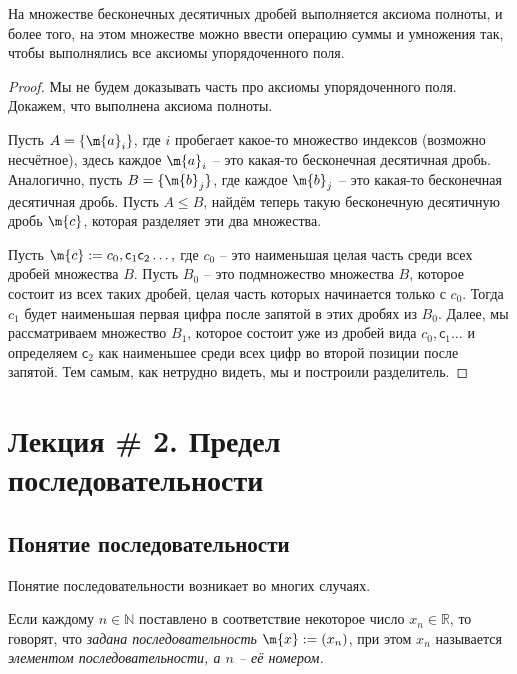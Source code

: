 \begin{theorem}
    На множестве бесконечных десятичных дробей выполняется аксиома полноты, и более того, на этом множестве можно ввести операцию суммы и умножения так, чтобы выполнялись все аксиомы упорядоченного поля.
\end{theorem}
\begin{proof}
    Мы не будем доказывать часть про аксиомы упорядоченного поля. Докажем, что выполнена аксиома полноты.

    Пусть $A = \{\m{a}_i\}$, где $i$ пробегает какое-то множество индексов (возможно несчётное), здесь каждое $\m{a}_i$ -- это какая-то бесконечная десятичная дробь. Аналогично, пусть $B = \{\m{b}_j\}$, где каждое $\m{b}_j$ -- это какая-то бесконечная десятичная дробь. Пусть $A\le B$, найдём теперь такую бесконечную десятичную дробь $\m{c}$, которая разделяет эти два множества.

    Пусть $\m{c}:= c_0,\mathsf{c}_1\mathsf{c}_2\ldots,$ где $c_0$ -- это наименьшая целая часть среди всех дробей множества $B$. Пусть $ B_0 $ -- это подмножество множества $B$, которое состоит из всех таких дробей, целая часть которых начинается только с $c_0$. Тогда $c_1$ будет наименьшая первая цифра после запятой в этих дробях из $B_0$. Далее, мы рассматриваем множество $B_1$, которое состоит уже из дробей вида $c_0,\mathsf{c}_1\ldots$ и определяем $\mathsf{c}_2$ как наименьшее среди всех цифр во второй позиции после запятой. Тем самым, как нетрудно видеть, мы и построили разделитель.

    \end{proof}


\section{Лекция \# 2. Предел последовательности}

\subsection{Понятие последовательности}

Понятие последовательности возникает во многих случаях.

\begin{definition}\label{def_of_seqeunce}
    Если каждому $n \in \mathbb{N}$ поставлено в соответствие некоторое число $x_n \in \mathbb{R}$, то говорят, что \textit{задана последовательность} $\m{x}:=(x_n)$, при этом $x_n$ называется \textit{элементом последовательности, а $n$ -- её номером.}
\end{definition}


